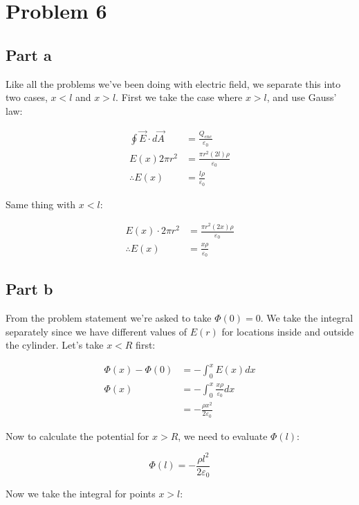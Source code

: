 \documentclass{article}
\theoremstyle{definition}
\numberwithin{equation}{section}
\numberwithin{definition}{section}
\begin{document}
    \section{Problem 6}

    \subsection{Part a}

    Like all the problems we've been doing with electric field, we separate this into two cases, $x < l$ and $x > l$. First we take the case where $x > l$, and use Gauss' law:

    \begin{align*}
        \oint \vec{E} \cdot d\vec{A} &= \frac{Q_{enc}}{\varepsilon_0}\\
        E(x) 2\pi r^2 &= \frac{\pi r^2 (2l)\rho}{\varepsilon_0}\\
        \therefore E(x) &= \frac{l\rho}{\varepsilon_0} 
    \end{align*}

    Same thing with $x < l$:

    \begin{align*}
        E(x) \cdot 2\pi r^2 &= \frac{\pi r^2 (2x)\rho}{\varepsilon_0}\\
        \therefore E(x) &= \frac{x\rho}{\varepsilon_0}
    \end{align*}

    \subsection{Part b}

    From the problem statement we're asked to take $\Phi(0) = 0$. We take the integral separately since we have different values of $E(r)$ for locations inside and outside the cylinder. Let's take $x < R$ first:

    \begin{align*}
        \Phi(x) - \Phi(0) &= -\int_0^x E(x) dx\\
        \Phi(x) &= -\int_0^x \frac{x\rho}{\varepsilon_0} dx\\
        &= -\frac{\rho x^2}{2\varepsilon_0}
    \end{align*}

    Now to calculate the potential for $x > R$, we need to evaluate $\Phi(l)$:

    \[ \Phi(l) = -\frac{\rho l^2}{2\varepsilon_0}\]

    Now we take the integral for points $x > l$: 
\end{document}
